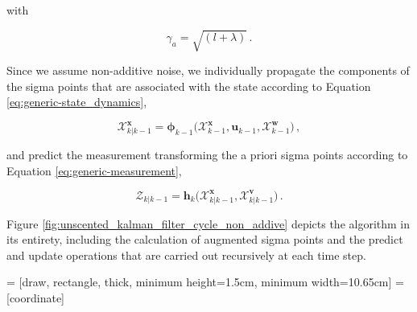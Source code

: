 \noindent
with

\begin{equation}
  \gamma_a = \sqrt{(l + \lambda)}\,.
\end{equation}


Since we assume non-additive noise, we individually propagate the components of the sigma points that are associated with the state according to Equation \ref{eq:generic-state_dynamics},

\begin{equation}
  \bm{\mathcal{X}}^{\bm{x}}_{k|k-1} = \bm{\phi}_{k-1}\big(\bm{\mathcal{X}}^{\bm{x}}_{k-1}, \bm{u}_{k-1}, \bm{\mathcal{X}}^{\bm{w}}_{k-1}\big)\,,
\end{equation}

\noindent
and predict the measurement transforming the a priori sigma points according to Equation \ref{eq:generic-measurement},

\begin{equation}
  \bm{\mathcal{Z}}_{k|k-1} = \bm{h}_{k}\big(\bm{\mathcal{X}}^{\bm{x}}_{k|k-1}, \bm{\mathcal{X}}^{\bm{v}}_{k|k-1}\big)\,.
\end{equation}

\noindent
Figure \ref{fig:unscented_kalman_filter_cycle_non_addive} depicts the algorithm in its entirety, including the calculation of augmented sigma points and the predict and update operations that are carried out recursively at each time step.


 = [draw, rectangle, thick, 
    minimum height=1.5cm, minimum width=10.65cm]
 = [coordinate]


